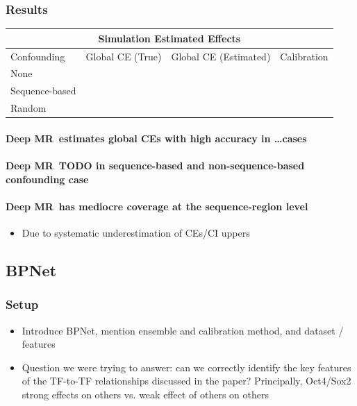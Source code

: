 \documentclass[twoside,11pt]{article}
\newcommand{\method}{{Deep MR}}
\begin{document}
\subsubsection{Results}%
\label{ssub:sim_results}
\begin{tabular}{ |p{3cm}||p{5cm}|p{5cm}|p{3cm}|  }
 \hline
 \multicolumn{4}{|c|}{Simulation Estimated Effects} \\
 \hline
 Confounding & Global CE (True) & Global CE (Estimated) & Calibration \\
 \hline
 None   &     & &   \\
 \hline
 Sequence-based & &  & \\
 \hline
 Random & & & \\
 \hline
\end{tabular}

\paragraph{\method\ estimates global CEs with high accuracy in \dots cases}%
\label{par:sim_res_1}

\paragraph{\method\ TODO in sequence-based and non-sequence-based confounding case}

\paragraph{\method\ has mediocre coverage at the sequence-region level}
\begin{itemize}
	\item Due to systematic underestimation of CEs/CI uppers
\end{itemize}

\subsection{BPNet}%
\label{sub:between_tf_relationships}

\subsubsection{Setup}%
\label{ssub:btwn_tf_setup}

\begin{itemize}
	\item Introduce BPNet, mention ensemble and calibration method, and dataset / features
	\item Question we were trying to answer: can we correctly identify the key features of the TF-to-TF relationships discussed in the paper? Principally, Oct4/Sox2 strong effects on others vs. weak effect of others on others
\end{itemize}
\end{document}
